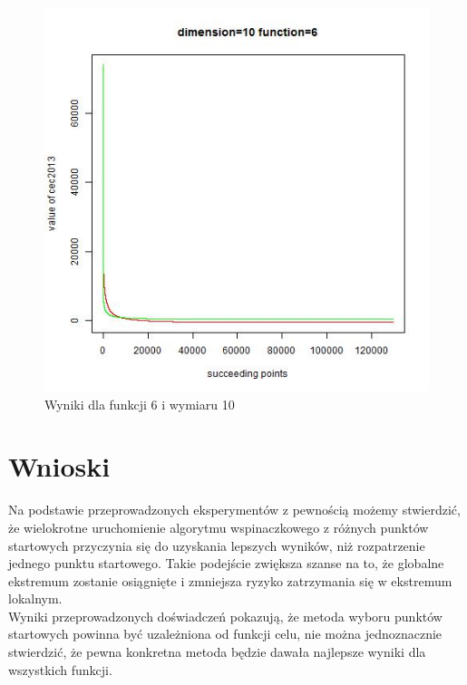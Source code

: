 \documentclass{article}
\begin{document}
\begin{figure}[H]
\centering
\includegraphics[scale=0.6]{dim_10__func_6}
\caption{Wyniki dla funkcji 6 i wymiaru 10}
\end{figure}

\section{Wnioski}

Na podstawie przeprowadzonych eksperymentów z pewnością możemy stwierdzić, że wielokrotne uruchomienie algorytmu wspinaczkowego z różnych punktów startowych przyczynia się do uzyskania lepszych wyników, niż rozpatrzenie jednego punktu startowego. Takie podejście zwiększa szanse na to, że globalne ekstremum zostanie osiągnięte i zmniejsza ryzyko zatrzymania się w ekstremum lokalnym.\\
Wyniki przeprowadzonych doświadczeń pokazują, że metoda wyboru punktów startowych powinna być uzależniona od funkcji celu, nie można jednoznacznie stwierdzić, że pewna konkretna metoda będzie dawała najlepsze wyniki dla wszystkich funkcji.
\end{document}
